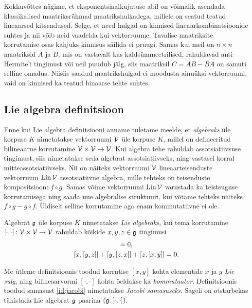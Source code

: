 Kokkuvõttes nägime, et eksponentsiaalkujutuse abil on võimalik asendada
klassikalised maatriksrühmad maatrikshulkadega, millele on seatud
teatud lineaarsed kitsendused. Selge, et need hulgad on kinnised
lineaarkombinatsioonide suhtes ja nii võib neid vaadelda kui vektorruume.
Tavalise maatriksite korrutamise osas kahjuks kinnisus säilida ei
pruugi. Samas kui meil on $n \times n$ maatriksid $A$ ja $B$, mis on vastavalt
kas kaldsümmeetrilised, rahuldavad anti-Hermite'i tingimust või neil
puudub jälg, siis maatriksil $C = AB - BA$ on samuti selline omadus.
Niisiis saadud maatrikshulgad ei moodusta ainuüksi vektorruumi,
vaid on kinnised ka teatud binaarse tehte suhtes.

\subsection{Lie algebra definitsioon}

Enne kui Lie algebra definitsiooni anname tuletame meelde, et \emph{algebraks}
üle korpuse $K$ nimetatakse vektorruumi $\mathcal{V}$ üle korpuse $K$, millel on
defineeritud bilineaarne korrutamine $\mathcal{V} \times \mathcal{V} \to \mathcal{V}$. Kui algebra
tehe rahuldab assotsiatiivsuse tingimust, siis nimetatakse seda algebrat
assotsiatiivseks, ning vastasel korral mitteassotsiatiivseks. Nii on näiteks
vektorruumi $\mathcal{V}$ lineaarteisenduste vektorruum $\operatorname{Lin} \mathcal{V}$ assotsiatiivne algebra,
mille tehteks on teisenduste kompositsioon: $f \circ g$. Samas võime
vektorruumi $\operatorname{Lin} \mathcal{V}$ varustada ka teistsuguse korrutamisega ning saada uue
algebralise struktuuri, kui võtame tehteks näiteks $f \circ g - g \circ f$.
Üldiselt selline korrutamine aga enam kommutatiivne ei ole.

\begin{dfn}\label{def:lie-algebra}
    Algebrat $\mathfrak{g}$ üle korpuse $K$ nimetatakse \emph{Lie algebraks}, kui
    tema korrutamine $[\cdot, \cdot] \colon \mathcal{V} \times \mathcal{V} \to \mathcal{V}$ rahuldab
    kõikide $x, y, z \in \mathfrak{g}$ tingimusi
    \begin{gather}
        [x, x] = 0,\label{id:bracket-antisymm} \\
        \brac{x}{\brac{y}{z}} + \brac{y}{\brac{z}{x}} +
            \brac{z}{\brac{x}{y}} = 0.\label{id:jacobi}
    \end{gather}
\end{dfn}


Me ütleme definitsioonis toodud korrutise $[x, y]$ kohta elementide $x$ ja
$y$ \emph{Lie sulg}, ning bilineaarvormi $[\cdot, \cdot]$ kohta öeldakse ka
\emph{kommutaator}. Definitsioonis toodud samasust \eqref{id:jacobi}
nimetatakse \emph{Jacobi samasuseks}. Sageli on otstarbekas tähistada Lie
algebrat $\mathfrak{g}$ paarina $(\mathfrak{g}, [\cdot, \cdot])$.

